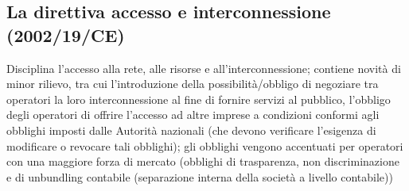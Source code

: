 \subsection{La direttiva accesso e interconnessione (2002/19/CE)}

Disciplina l’accesso alla rete, alle risorse e all’interconnessione; contiene novità di minor rilievo, tra cui l’introduzione della possibilità/obbligo di negoziare tra operatori la loro interconnessione al fine di fornire servizi al pubblico, l’obbligo degli operatori di offrire l’accesso ad altre imprese a condizioni conformi agli obblighi imposti dalle Autorità nazionali (che devono verificare l’esigenza di modificare o revocare tali obblighi); gli obblighi vengono
accentuati per operatori con una maggiore forza di mercato (obblighi di trasparenza, non discriminazione e di unbundling contabile (separazione interna della società a livello contabile))